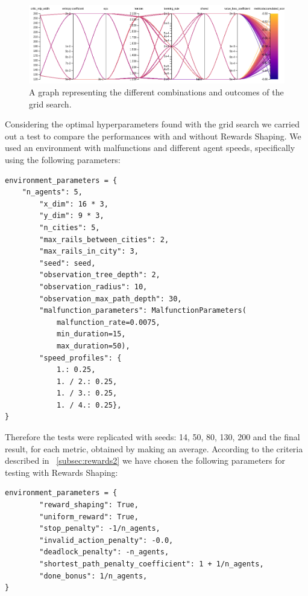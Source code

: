 \documentclass[11pt, a4paper, hidelinks]{report}
\begin{document}
\begin{figure}
\centering
\includegraphics[width=1.0\textwidth]{resources/psppo_sweep.png}
\caption{A graph representing the different combinations and outcomes of the grid search.}
\label{fig:psppo_sweep}
\end{figure}
\newpage
Considering the optimal hyperparameters found with the grid search we carried out a test to compare the performances with and without Rewards Shaping.
We used an environment with malfunctions and different agent speeds, specifically using the following parameters:

\begin{lstlisting}[label={lst:psppo-net-init}]
environment_parameters = {
	"n_agents": 5,
        "x_dim": 16 * 3,
        "y_dim": 9 * 3,
        "n_cities": 5,
        "max_rails_between_cities": 2,
        "max_rails_in_city": 3,
        "seed": seed,
        "observation_tree_depth": 2,
        "observation_radius": 10,
        "observation_max_path_depth": 30,
        "malfunction_parameters": MalfunctionParameters(
            malfunction_rate=0.0075,
            min_duration=15,
            max_duration=50),
        "speed_profiles": {
            1.: 0.25,
            1. / 2.: 0.25,
            1. / 3.: 0.25,
            1. / 4.: 0.25},
}
\end{lstlisting}

Therefore the tests were replicated with seeds: 14, 50, 80, 130, 200 and the final result, for each metric, obtained by making an average.
According to the criteria described in ~\ref{subsec:rewards2} we have chosen the following parameters for testing with Rewards Shaping:

\begin{lstlisting}[label={lst:psppo-net-init}]
environment_parameters = {
        "reward_shaping": True,
        "uniform_reward": True,
        "stop_penalty": -1/n_agents,
        "invalid_action_penalty": -0.0,
        "deadlock_penalty": -n_agents,
        "shortest_path_penalty_coefficient": 1 + 1/n_agents,
        "done_bonus": 1/n_agents,
}
\end{lstlisting}
\end{document}
